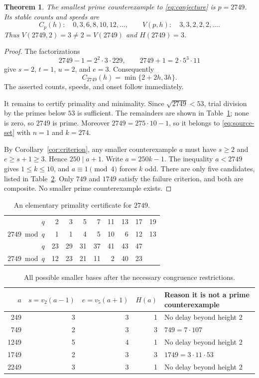\documentclass[11pt,letterpaper]{article}
\numberwithin{equation}{section}
\newtheorem{theorem}{Theorem}[section]
\theoremstyle{definition}
\theoremstyle{remark}
\begin{document}
\begin{theorem}\label{thm:2749}
The smallest prime counterexample to \eqref{eq:conjecture} is $p=2749$. Its stable counts and speeds are
\[
 C_p(h):\quad 0,3,6,8,10,12,\ldots,
 \qquad
 V(p,h):\quad 3,3,2,2,2,\ldots.
\]
Thus $V(2749,2)=3\ne2=V(2749)$ and $H(2749)=3$.
\end{theorem}
\begin{proof}
The factorizations
\[
 2749-1=2^2\cdot3\cdot229,\qquad
 2749+1=2\cdot5^3\cdot11
\]
give $s=2$, $t=1$, $u=2$, and $e=3$. Consequently
\begin{equation}\label{eq:2749}
 C_{2749}(h)=\min\{2+2h,3h\}.
\end{equation}
The asserted counts, speeds, and onset follow immediately.

It remains to certify primality and minimality. Since $\sqrt{2749}<53$, trial division by the primes below $53$ is sufficient. The remainders are shown in Table~\ref{tab:primecert}; none is zero, so $2749$ is prime. Moreover $2749=275\cdot10-1$, so it belongs to \eqref{eq:source-set} with $n=1$ and $k=274$.

By Corollary~\ref{cor:criterion}, any smaller counterexample $a$ must have $s\ge2$ and $e\ge s+1\ge3$. Hence $250\mid a+1$. Write $a=250k-1$. The inequality $a<2749$ gives $1\le k\le10$, and $a\equiv1\pmod4$ forces $k$ odd. There are only five candidates, listed in Table~\ref{tab:minimality}. Only $749$ and $1749$ satisfy the failure criterion, and both are composite. No smaller prime counterexample exists.
\end{proof}

\begin{table}[htbp]
\centering
\caption{An elementary primality certificate for $2749$.}\label{tab:primecert}
\begin{tabular}{rrrrrrrrr}
\toprule
$q$&2&3&5&7&11&13&17&19\\
$2749\bmod q$&1&1&4&5&10&6&12&13\\
\midrule
$q$&23&29&31&37&41&43&47&\\
$2749\bmod q$&12&23&21&11&2&40&23&\\
\bottomrule
\end{tabular}
\end{table}

\begin{table}[htbp]
\centering
\caption{All possible smaller bases after the necessary congruence restrictions.}\label{tab:minimality}
\begin{tabular}{rrrrl}
\toprule
$a$&$s=v_2(a-1)$&$e=v_5(a+1)$&$H(a)$&Reason it is not a prime counterexample\\
\midrule
249&3&3&1&No delay beyond height 2\\
749&2&3&3&$749=7\cdot107$\\
1249&5&4&1&No delay beyond height 2\\
1749&2&3&3&$1749=3\cdot11\cdot53$\\
2249&3&3&1&No delay beyond height 2\\
\bottomrule
\end{tabular}
\end{table}
\end{document}
